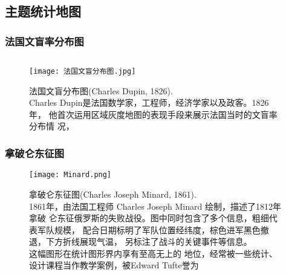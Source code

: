 \subsection{主题统计地图}
\subsubsection{法国文盲率分布图}
\begin{frame}{\subsecname}{\subsubsecname}

  \begin{figure}
    \begin{columns}
      \begin{column}{.6\textwidth}
        \texttt{[image: 法国文盲分布图.jpg]}
      \end{column}

      \begin{column}{.35\textwidth}
        \centering
        \caption{法国文盲分布图(Charles Dupin, 1826). \\
          Charles Dupin是法国数学家，工程师，经济学家以及政客。1826年，
          他首次运用区域灰度地图的表现手段来展示法国当时的文盲率分布情
          况，}
      \end{column}
    \end{columns}
  \end{figure}
\end{frame}

\subsubsection{拿破仑东征图}
\begin{frame}{\subsecname}{\subsubsecname}
  \begin{figure}
    \centering \texttt{[image: Minard.png]}
    \caption{拿破仑东征图(Charles Joseph Minard, 1861). \\
      1861年，由法国工程师 Charles Joseph Minard 绘制，描述了1812年拿破
      仑东征俄罗斯的失败战役。图中同时包含了多个信息，粗细代表军队规模，
      配合日期标明了军队位置经纬度，棕色进军黑色撤退，下方折线展现气温，
      另标注了战斗的关键事件等信息。\\这幅图形在统计图形界内享有至高无上的
      地位，经常被一些统计、设计课程当作教学案例，被Edward
      Tufte誉为}
  \end{figure}
\end{frame}


